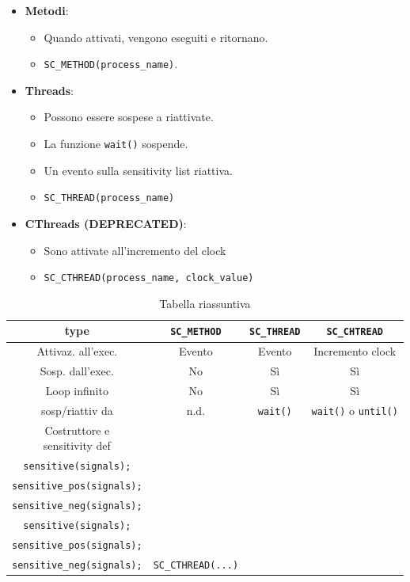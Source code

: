 \documentclass[a4paper]{article}
\begin{document}
			\begin{multicols}{2}
				\begin{itemize}
				\item \textbf{Metodi}: 
				\begin{itemize}
					\item Quando attivati, vengono eseguiti e ritornano. 
					\item \lstinline|SC_METHOD(process_name)|.
				\end{itemize}
				\item \textbf{Threads}: 
				\begin{itemize}
					\item Possono essere sospese a riattivate. 
					\item La funzione \lstinline|wait()| sospende.
					\item Un evento sulla sensitivity list riattiva.
					\item \lstinline|SC_THREAD(process_name)|
				\end{itemize}
				\columnbreak
				\item \textbf{CThreads (DEPRECATED)}:
				\begin{itemize}
					\item Sono attivate all'incremento del clock
					\item \lstinline[basicstyle=\small\ttfamily]|SC_CTHREAD(process_name, clock_value)|
				\end{itemize}
			\end{itemize}
			\end{multicols}
			
			\begin{table}
				\begin{tabular}{cccc}
					\toprule
					\textbf{type} & \lstinline|SC_METHOD| & \lstinline|SC_THREAD| & \lstinline|SC_CHTREAD| \\
					\midrule
					Attivaz. all'exec. & Evento & Evento & Incremento clock \\
					Sosp. dall'exec. & No & Sì & Sì \\
					Loop infinito & No & Sì & Sì\\
					sosp/riattiv da & n.d. & \lstinline|wait()| &  \lstinline|wait()| o \lstinline|until()| \\
					\makecell{Costruttore e\\ sensitivity def} & \makecell{\lstinline|SC_METHOD(call_back);|\\
						\lstinline|sensitive(signals);|\\
						\lstinline|sensitive_pos(signals);|\\
						\lstinline|sensitive_neg(signals);|} &
						\makecell{\lstinline|SC_THREAD(call_back);|\\
							\lstinline|sensitive(signals);|\\
							\lstinline|sensitive_pos(signals);|\\
							\lstinline|sensitive_neg(signals);|} & \lstinline|SC_CTHREAD(...)| \\
					\bottomrule
				\end{tabular}
				\caption{Tabella riassuntiva}
			\end{table}
			
\end{document}
